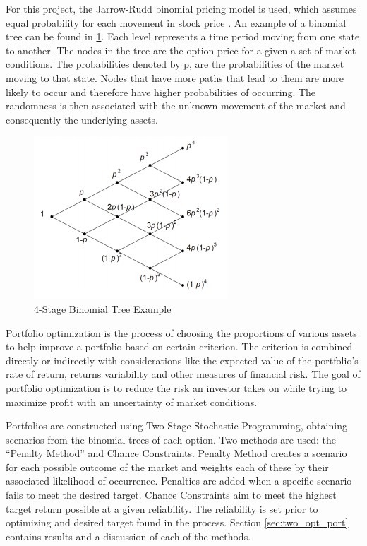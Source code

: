 \documentclass[12pt]{article}
\begin{document}
For this project, the Jarrow-Rudd binomial pricing model is used, which assumes equal probability for each movement in stock price \cite{jarrow1983option, jrudd_other, jrudd_impl}. An example of a binomial tree can be found in \ref{fig:bin_tree}. Each level represents a time period moving from one state to another. The nodes in the tree are the option price for a given a set of market conditions. The probabilities denoted by p, are the probabilities of the market moving to that state. Nodes that have more paths that lead to them are more likely to occur and therefore have higher probabilities of occurring. The randomness is then associated with the unknown movement of the market and consequently the underlying assets.
 
 \begin{figure}[H]
  \begin{centering}
    \includegraphics[scale=1.0]{bin_tree.png}
    \caption{4-Stage Binomial Tree Example \cite{bin_tree}}
    \label{fig:bin_tree}
  \end{centering}
\end{figure}
 
Portfolio optimization is the process of choosing the proportions of various assets to help improve a portfolio based on certain criterion. The criterion is combined directly or indirectly with considerations like the expected value of the portfolio’s rate of return, returns variability and other measures of financial risk. The goal of portfolio optimization is to reduce the risk an investor takes on while trying to maximize profit with an uncertainty of market conditions.

Portfolios are constructed using Two-Stage Stochastic Programming, obtaining scenarios from the binomial trees of each option. Two methods are used: the ``Penalty Method'' and Chance Constraints. Penalty Method creates a scenario for each possible outcome of the market and weights each of these by their associated likelihood of occurrence. Penalties are added when a specific scenario fails to meet the desired target. Chance Constraints aim to meet the highest target return possible at a given reliability. The reliability is set prior to optimizing and desired target found in the process. Section \ref{sec:two_opt_port} contains results and a discussion of each of the methods.
\end{document}
